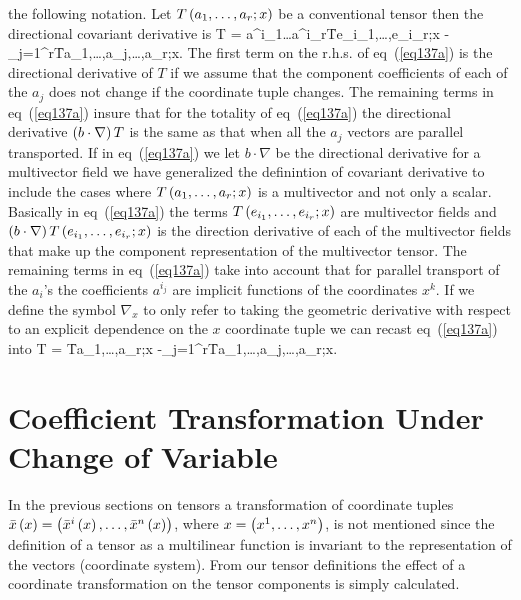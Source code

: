 the following notation.  Let ${T}\left ( {a_{1},\dots,a_{r};x} \right )$ be a conventional tensor then the directional covariant 
derivative is
\be
	T = a^{i_{1}}\dots a^{i_{r}}\f{T}{e_{i_{1}},\dots,e_{i_{r}};x}
						   -\sum_{j=1}^{r}\f{T}{a_{1},\dots,a_{j},\dots,a_{r};x}.	\label{eq137a}
\ee
The first term on the r.h.s. of eq~(\ref{eq137a}) is the directional derivative of $T$ if we assume that the component 
coefficients of each of the $a_{j}$ does not change if the coordinate tuple changes. The remaining terms in 
eq~(\ref{eq137a}) insure that for the totality of eq~(\ref{eq137a}) the directional derivative $\left ( {b\cdot\nabla} \right ) T$
is the same as that when all the  $a_{j}$ vectors are parallel transported.  If in eq~(\ref{eq137a}) we let 
$b\cdot\nabla$ be the directional derivative for a multivector field we have generalized the definintion of covariant
derivative to include the cases where ${T}\left ( {a_{1},\dots,a_{r};x} \right )$ is a multivector and not only a scalar.  Basically in 
eq~(\ref{eq137a}) the terms ${T}\left ( {e_{i_{1}},\dots,e_{i_{r}};x} \right )$ are multivector fields and 
$\left ( {b\cdot\nabla} \right ){T}\left ( {e_{i_{1}},\dots,e_{i_{r}};x} \right )$ is the direction derivative of each of the multivector fields that
make up the component representation of the multivector tensor.  The remaining terms in eq~(\ref{eq137a}) take into account
that for parallel transport of the $a_{i}$'s the coefficients $a^{i_{j}}$ are implicit functions of the coordinates
$x^{k}$. If we define the symbol $\nabla_{x}$ to only refer to taking the geometric derivative with respect to an explicit
dependence on the $x$ coordinate tuple we can recast eq~(\ref{eq137a}) into
\be
	T = \f{T}{a_{1},\dots,a_{r};x}
						   -\sum_{j=1}^{r}\f{T}{a_{1},\dots,a_{j},\dots,a_{r};x}.	\label{eq137a}
\ee

\section{Coefficient Transformation Under Change of Variable}
In the previous sections on tensors a transformation of coordinate tuples 
${\bar{x}}\left ( {x} \right ) = \left ( {{\bar{x}^{i}}\left ( {x} \right ),\dots,{\bar{x}^{n}}\left ( {x} \right )} \right )$,
where $x=\left ( {x^{1},\dots,x^{n}} \right )$, is not mentioned since the definition of a tensor as a multilinear function is 
invariant to the representation of the vectors (coordinate system).  From our tensor definitions the effect of a coordinate
transformation on the tensor components is simply calculated.

